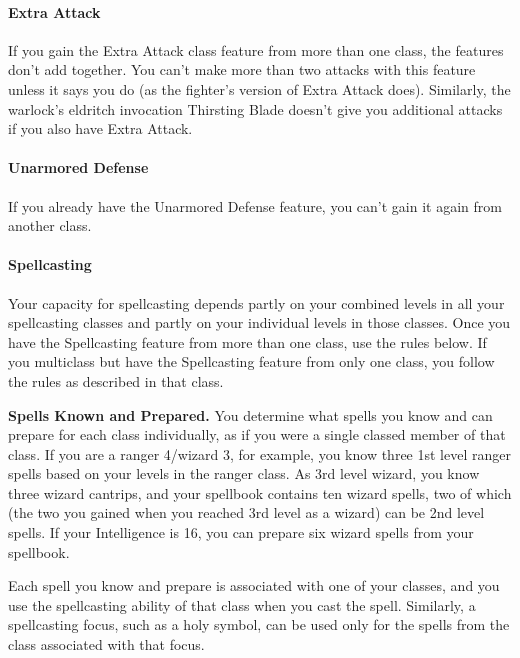 \documentclass[
]{article}
\begin{document}
\hypertarget{extra-attack}{%
\paragraph{Extra Attack}\label{extra-attack}}

If you gain the Extra Attack class feature from more than one class, the
features don't add together. You can't make more than two attacks with
this feature unless it says you do (as the fighter's version of Extra
Attack does). Similarly, the warlock's eldritch invocation Thirsting
Blade doesn't give you additional attacks if you also have Extra Attack.

\hypertarget{unarmored-defense}{%
\paragraph{Unarmored Defense}\label{unarmored-defense}}

If you already have the Unarmored Defense feature, you can't gain it
again from another class.

\hypertarget{spellcasting}{%
\paragraph{Spellcasting}\label{spellcasting}}

Your capacity for spellcasting depends partly on your combined levels in
all your spellcasting classes and partly on your individual levels in
those classes. Once you have the Spellcasting feature from more than one
class, use the rules below. If you multiclass but have the Spellcasting
feature from only one class, you follow the rules as described in that
class.

\textbf{Spells Known and Prepared.} You determine what spells you know
and can prepare for each class individually, as if you were a single
classed member of that class. If you are a ranger 4/wizard 3, for
example, you know three 1st level ranger spells based on your levels in
the ranger class. As 3rd level wizard, you know three wizard cantrips,
and your spellbook contains ten wizard spells, two of which (the two you
gained when you reached 3rd level as a wizard) can be 2nd level spells.
If your Intelligence is 16, you can prepare six wizard spells from your
spellbook.

Each spell you know and prepare is associated with one of your classes,
and you use the spellcasting ability of that class when you cast the
spell. Similarly, a spellcasting focus, such as a holy symbol, can be
used only for the spells from the class associated with that focus.
\end{document}

